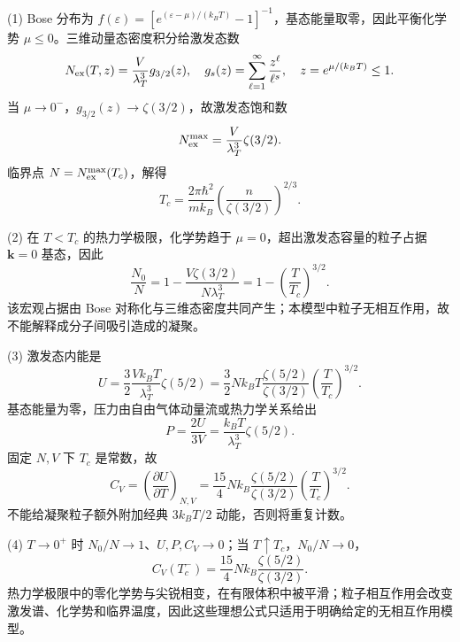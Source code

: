 (1) Bose 分布为 \(f(\varepsilon)=[e^{(\varepsilon-\mu)/(k_BT)}-1]^{-1}\)，基态能量取零，因此平衡化学势 \(\mu\le0\)。三维动量态密度积分给激发态数
\[
N_{\rm ex}(T,z)=\frac{V}{\lambda_T^3}g_{3/2}(z),\quad
g_s(z)=\sum_{\ell=1}^\infty\frac{z^\ell}{\ell^s},\quad z=e^{\mu/(k_BT)}\le1.
\]
当 \(\mu\to0^-\)，\(g_{3/2}(z)\to\zeta(3/2)\)，故激发态饱和数
\[
N_{\rm ex}^{\max}=\frac V{\lambda_T^3}\zeta(3/2).
\]
临界点 \(N=N_{\rm ex}^{\max}(T_c)\)，解得
\[
T_c=\frac{2\pi\hbar^2}{mk_B}
\left(\frac{n}{\zeta(3/2)}\right)^{2/3}.
\]

(2) 在 \(T<T_c\) 的热力学极限，化学势趋于 \(\mu=0\)，超出激发态容量的粒子占据 \(\boldsymbol k=0\) 基态，因此
\[
\frac{N_0}{N}=1-\frac{V\zeta(3/2)}{N\lambda_T^3}
=1-\left(\frac{T}{T_c}\right)^{3/2}.
\]
该宏观占据由 Bose 对称化与三维态密度共同产生；本模型中粒子无相互作用，故不能解释成分子间吸引造成的凝聚。

(3) 激发态内能是
\[
U=\frac32\frac{Vk_BT}{\lambda_T^3}\zeta(5/2)
=\frac32Nk_BT\frac{\zeta(5/2)}{\zeta(3/2)}
\left(\frac{T}{T_c}\right)^{3/2}.
\]
基态能量为零，压力由自由气体动量流或热力学关系给出
\[
P=\frac{2U}{3V}=\frac{k_BT}{\lambda_T^3}\zeta(5/2).
\]
固定 \(N,V\) 下 \(T_c\) 是常数，故
\[
C_V=\left(\frac{\partial U}{\partial T}\right)_{N,V}
=\frac{15}{4}Nk_B\frac{\zeta(5/2)}{\zeta(3/2)}
\left(\frac{T}{T_c}\right)^{3/2}.
\]
不能给凝聚粒子额外附加经典 \(3k_BT/2\) 动能，否则将重复计数。

(4) \(T\to0^+\) 时 \(N_0/N\to1\)、\(U,P,C_V\to0\)；当 \(T\uparrow T_c\)，\(N_0/N\to0\)，
\[
C_V(T_c^-)=\frac{15}{4}Nk_B\frac{\zeta(5/2)}{\zeta(3/2)}.
\]
热力学极限中的零化学势与尖锐相变，在有限体积中被平滑；粒子相互作用会改变激发谱、化学势和临界温度，因此这些理想公式只适用于明确给定的无相互作用模型。
